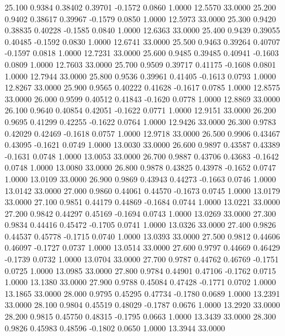   25.100   0.9384   0.38402   0.39701  -0.1572   0.0860   1.0000  12.5570  33.0000
  25.200   0.9402   0.38617   0.39967  -0.1579   0.0850   1.0000  12.5973  33.0000
  25.300   0.9420   0.38835   0.40228  -0.1585   0.0840   1.0000  12.6363  33.0000
  25.400   0.9439   0.39055   0.40485  -0.1592   0.0830   1.0000  12.6741  33.0000
  25.500   0.9463   0.39264   0.40707  -0.1597   0.0818   1.0000  12.7231  33.0000
  25.600   0.9485   0.39485   0.40941  -0.1603   0.0809   1.0000  12.7603  33.0000
  25.700   0.9509   0.39717   0.41175  -0.1608   0.0801   1.0000  12.7944  33.0000
  25.800   0.9536   0.39961   0.41405  -0.1613   0.0793   1.0000  12.8267  33.0000
  25.900   0.9565   0.40222   0.41628  -0.1617   0.0785   1.0000  12.8575  33.0000
  26.000   0.9599   0.40512   0.41843  -0.1620   0.0778   1.0000  12.8869  33.0000
  26.100   0.9640   0.40854   0.42051  -0.1622   0.0771   1.0000  12.9151  33.0000
  26.200   0.9695   0.41299   0.42255  -0.1622   0.0764   1.0000  12.9426  33.0000
  26.300   0.9783   0.42029   0.42469  -0.1618   0.0757   1.0000  12.9718  33.0000
  26.500   0.9906   0.43467   0.43095  -0.1621   0.0749   1.0000  13.0030  33.0000
  26.600   0.9897   0.43587   0.43389  -0.1631   0.0748   1.0000  13.0053  33.0000
  26.700   0.9887   0.43706   0.43683  -0.1642   0.0748   1.0000  13.0080  33.0000
  26.800   0.9878   0.43825   0.43978  -0.1652   0.0747   1.0000  13.0109  33.0000
  26.900   0.9869   0.43943   0.44273  -0.1663   0.0746   1.0000  13.0142  33.0000
  27.000   0.9860   0.44061   0.44570  -0.1673   0.0745   1.0000  13.0179  33.0000
  27.100   0.9851   0.44179   0.44869  -0.1684   0.0744   1.0000  13.0221  33.0000
  27.200   0.9842   0.44297   0.45169  -0.1694   0.0743   1.0000  13.0269  33.0000
  27.300   0.9834   0.44416   0.45472  -0.1705   0.0741   1.0000  13.0326  33.0000
  27.400   0.9826   0.44537   0.45778  -0.1715   0.0740   1.0000  13.0393  33.0000
  27.500   0.9812   0.44606   0.46097  -0.1727   0.0737   1.0000  13.0514  33.0000
  27.600   0.9797   0.44669   0.46429  -0.1739   0.0732   1.0000  13.0704  33.0000
  27.700   0.9787   0.44762   0.46769  -0.1751   0.0725   1.0000  13.0985  33.0000
  27.800   0.9784   0.44901   0.47106  -0.1762   0.0715   1.0000  13.1380  33.0000
  27.900   0.9788   0.45084   0.47428  -0.1771   0.0702   1.0000  13.1865  33.0000
  28.000   0.9795   0.45295   0.47734  -0.1780   0.0689   1.0000  13.2391  33.0000
  28.100   0.9804   0.45519   0.48029  -0.1787   0.0676   1.0000  13.2920  33.0000
  28.200   0.9815   0.45750   0.48315  -0.1795   0.0663   1.0000  13.3439  33.0000
  28.300   0.9826   0.45983   0.48596  -0.1802   0.0650   1.0000  13.3944  33.0000
